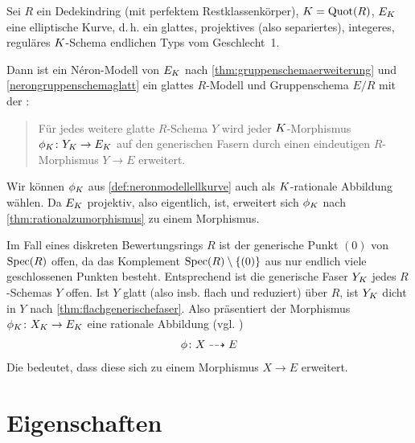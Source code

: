 \documentclass[german]{scrreprt}
\begin{document}

\begin{Bemerkung}
  \label{def:neronmodellellkurve}
  Sei $R$ ein Dedekindring (mit perfektem Restklassenkörper),
  $K=\operatorname{Quot}(R)$, $E_{K}$ eine elliptische Kurve, d.\,h. ein
  glattes, projektives (also separiertes), integeres, reguläres
  $K$-Schema endlichen Typs vom Geschlecht~1.
  
  Dann ist ein Néron-Modell von $E_{K}$ nach
  \ref{thm:gruppenschemaerweiterung} und \ref{nerongruppenschemaglatt}
  ein glattes $R$-Modell und Gruppenschema $E/R$ mit der
  \NAbbEig:
  \begin{quote}
    Für jedes weitere glatte $R$-Schema $Y$ wird jeder
    $K$-Morphismus $\phi_{K}\colon Y_{K}\to E_{K}$ auf den generischen
    Fasern durch einen eindeutigen $R$-Morphismus $Y\to E$ erweitert.
  \end{quote}
\end{Bemerkung}
\begin{Bemerkung}\label{thm:dichtefaser}
  Wir können $\phi_{K}$ aus \autoref{def:neronmodellellkurve} auch als
  $K$-rationale Abbildung wählen. Da $E_{K}$ projektiv, also eigentlich,
  ist, erweitert sich $\phi_{K}$ nach
  \autoref{thm:rationalzumorphismus} zu einem Morphismus.

  Im Fall eines diskreten Bewertungsrings $R$ ist der generische Punkt
  $(0)$ von $\operatorname{Spec}(R)$ offen, da das Komplement
  $\operatorname{Spec}(R)\setminus\{(0)\}$ aus nur endlich viele geschlossenen
  Punkten besteht. Entsprechend ist die generische Faser $Y_{K}$ jedes
  $R$-Schemas $Y$ offen.
  Ist $Y$ glatt (also insb. flach und reduziert) über $R$, ist $Y_{K}$
  dicht in $Y$ nach \autoref{thm:flachgenerischefaser}.
  Also präsentiert der Morphismus $\phi_{K}\colon X_{K}\to E_{K}$ eine
  rationale Abbildung (vgl. \label{def:ratabb})
  \begin{gather*}
    \phi\colon X\dashrightarrow E
  \end{gather*}
  Die \NAbbEig bedeutet, dass diese sich zu einem Morphismus $X\to E$
  erweitert.
\end{Bemerkung}


\section{Eigenschaften}
\end{document}
